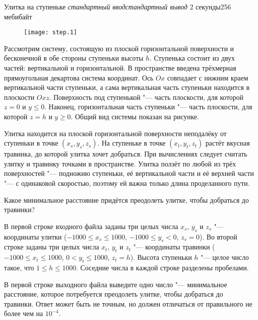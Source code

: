 
\begin{problem}{Улитка на ступеньке}
{\textsl{стандартный ввод}}{\textsl{стандартный вывод}}
{2 секунды}{256 мебибайт}{}

{

\begin{figure}
\texttt{[image: step.1]}
\end{figure}

Рассмотрим систему, состоящую из плоской горизонтальной поверхности и
бесконечной в обе стороны ступеньки высоты $h$.
Ступенька состоит из двух частей: вертикальной и горизонтальной.
В пространстве введена трёхмерная прямоугольная декартова система координат.
Ось $Ox$ совпадает с нижним краем вертикальной части ступеньки,
а сама вертикальная часть ступеньки находится в плоскости $Oxz$.
Поверхность под ступенькой "--- часть плоскости,
для которой $z = 0$ и $y \le 0$.
Наконец, горизонтальная часть ступеньки "--- часть плоскости,
для которой $z = h$ и $y \ge 0$.
Общий вид системы показан на рисунке.

}

Улитка находится на плоской горизонтальной поверхности неподалёку от ступеньки
в точке $(x_s, y_s, z_s)$.
На ступеньке в точке $(x_t, y_t, z_t)$ растёт вкусная травинка,
до которой улитка хочет добраться.
При вычислениях следует считать улитку и травинку точками в пространстве.
Улитка ползёт по любой из трёх поверхностей "--- подножию ступеньки,
её вертикальной части и её верхней части "--- с одинаковой скоростью,
поэтому ей важна только длина проделанного пути.

Какое минимальное расстояние придётся преодолеть улитке, чтобы добраться
до травинки?

\InputFile

В первой строке входного файла заданы три целых числа $x_s$, $y_s$ и $z_s$ "---
координаты улитки ($-1000 \le x_s \le 1000$, $-1000 \le y_s < 0$, $z_s = 0$).
Во второй строке заданы три целых числа $x_t$, $y_t$ и $z_t$ "---
координаты травинки ($-1000 \le x_t \le 1000$, $0 < y_t \le 1000$, $z_t = h$).
Высота ступеньки $h$ "--- целое число такое, что $1 \le h \le 1000$.
Соседние числа в каждой строке разделены пробелами.

\OutputFile

В первой строке выходного файла выведите одно число "---
минимальное расстояние, которое потребуется преодолеть улитке,
чтобы добраться до травинки.
Ответ может быть не точным, но должен отличаться от правильного
не более чем на $10^{-4}$.


\end{problem}

